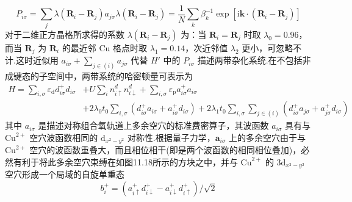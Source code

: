 \begin{subequations}
\begin{equation}
  P_{i\sigma}=\sum_{j}\lambda(\boldsymbol{R}_{i}-\boldsymbol{R}_{j})a_{j\sigma}
\end{equation}
\begin{equation}
  \lambda(\boldsymbol{R}_{i}-\boldsymbol{R}_{j})=\frac{1}{N}\sum_{k}\beta_{k}^{-1}
  \exp[\mathrm{i}\boldsymbol{k}\cdot(\boldsymbol{R}_{i}-\boldsymbol{R}_{j})]
\end{equation}
\end{subequations}
对于二维正方晶格所求得的系数 $\lambda(\boldsymbol{R}_{i}-\boldsymbol{R}_{j})$ 为：当 $\boldsymbol{R}_{i}=\boldsymbol{R}_{j}$ 时取 $\lambda_{0}=0.96$，而当 $\boldsymbol{R}_{j}$ 为 $\boldsymbol{R}_{i}$ 的最近邻 Cu 格点时取 $\lambda_{1}=0.14$，次近邻值 $\lambda_{2}$ 更小，可忽略不计.这时近似用 $a_{i\sigma}+\sum_{j\in(i)}a_{j\sigma}$ 代替 $H'$ 中的 $P_{i\sigma}$ 描述两带杂化系统.在不包括非成键态的子空间中，两带系统的哈密顿量可表示为
\begin{equation}
\begin{aligned}
  H=\sum_{i,\sigma}\varepsilon_{\mathrm{d}}d_{i\sigma}^{+}d_{i\sigma}
  &+U\sum_{i}n_{i\uparrow}^{d}n_{i\downarrow}^{d}
  +\sum_{i,\sigma}\varepsilon_{\mathrm{p}}a_{i\sigma}^{+}a_{i\sigma}\\
  &+2\lambda_{0}t_{0}\sum_{i,\sigma}(d_{i\sigma}^{+}a_{i\sigma}+a_{i\sigma}^{+}d_{i\sigma})
  +2\lambda_{1}t_{0}\sum_{i,\sigma}\sum_{j\in(i)}(d_{i\sigma}^{+}a_{j\sigma}+a_{j\sigma}^{+}d_{i\sigma})
\end{aligned}
\end{equation}
其中 $a_{i\sigma}$ 是描述对称组合氧轨道上多余空穴的标准费密算子，其波函数 $a_{i\sigma}$ 具有与 $\mathrm{Cu}^{2+}$ 空穴波函数相同的 $\mathrm{d}_{x^{2}-y^{2}}$ 对称性.根据量子力学，$\boldsymbol{a}_{i\sigma}$ 上的多余空穴由于与 $\mathrm{Cu}^{2+}$ 空穴的波函数重叠大，而且相位相干(即是两个波函数的相同相位叠加)，必然有利于将此多余空穴束缚在如图11.18所示的方块之中，并与 $\mathrm{Cu}^{2+}$ 的 $3\mathrm{d}_{x^{2}-y^{2}}$ 空穴形成一个局域的自旋单重态
\begin{equation}
  b_{i}^{+}=(a_{i\uparrow}^{+}d_{i\downarrow}^{+}-a_{i\downarrow}^{+}d_{i\uparrow}^{+})/\sqrt{2}
\end{equation}

